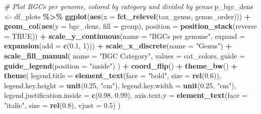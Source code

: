 \documentclass[
]{article}
\newenvironment{Shaded}{\begin{snugshade}}{\end{snugshade}}
\newcommand{\AttributeTok}[1]{\textcolor[rgb]{0.13,0.29,0.53}{#1}}
\newcommand{\CommentTok}[1]{\textcolor[rgb]{0.56,0.35,0.01}{\textit{#1}}}
\newcommand{\ConstantTok}[1]{\textcolor[rgb]{0.56,0.35,0.01}{#1}}
\newcommand{\DecValTok}[1]{\textcolor[rgb]{0.00,0.00,0.81}{#1}}
\newcommand{\FloatTok}[1]{\textcolor[rgb]{0.00,0.00,0.81}{#1}}
\newcommand{\FunctionTok}[1]{\textcolor[rgb]{0.13,0.29,0.53}{\textbf{#1}}}
\newcommand{\NormalTok}[1]{#1}
\newcommand{\OtherTok}[1]{\textcolor[rgb]{0.56,0.35,0.01}{#1}}
\newcommand{\SpecialCharTok}[1]{\textcolor[rgb]{0.81,0.36,0.00}{\textbf{#1}}}
\newcommand{\StringTok}[1]{\textcolor[rgb]{0.31,0.60,0.02}{#1}}
\begin{document}
\begin{Shaded}
\begin{Highlighting}[]
\CommentTok{\# Plot BGCs per genome, colored by category and divided by genus}
\NormalTok{p\_bgc\_dens }\OtherTok{\textless{}{-}}\NormalTok{ df\_plots }\SpecialCharTok{\%\textgreater{}\%}
  \FunctionTok{ggplot}\NormalTok{(}\FunctionTok{aes}\NormalTok{(}\AttributeTok{x =} \FunctionTok{fct\_relevel}\NormalTok{(tax\_genus, genus\_order))) }\SpecialCharTok{+}
  \FunctionTok{geom\_col}\NormalTok{(}\FunctionTok{aes}\NormalTok{(}\AttributeTok{y =}\NormalTok{ bgc\_dens, }\AttributeTok{fill =}\NormalTok{ group), }\AttributeTok{position =} \FunctionTok{position\_stack}\NormalTok{(}\AttributeTok{reverse =} \ConstantTok{TRUE}\NormalTok{)) }\SpecialCharTok{+}
  \FunctionTok{scale\_y\_continuous}\NormalTok{(}\AttributeTok{name =} \StringTok{"BGCs per genome"}\NormalTok{, }\AttributeTok{expand =} \FunctionTok{expansion}\NormalTok{(}\AttributeTok{add =} \FunctionTok{c}\NormalTok{(}\FloatTok{0.1}\NormalTok{, }\DecValTok{1}\NormalTok{))) }\SpecialCharTok{+}
  \FunctionTok{scale\_x\_discrete}\NormalTok{(}\AttributeTok{name =} \StringTok{"Genus"}\NormalTok{) }\SpecialCharTok{+}
  \FunctionTok{scale\_fill\_manual}\NormalTok{(}
    \AttributeTok{name =} \StringTok{"BGC Category"}\NormalTok{,}
    \AttributeTok{values =}\NormalTok{ cat\_colors,}
    \AttributeTok{guide =} \FunctionTok{guide\_legend}\NormalTok{(}\AttributeTok{position =} \StringTok{"inside"}\NormalTok{)}
\NormalTok{  ) }\SpecialCharTok{+}
  \FunctionTok{coord\_flip}\NormalTok{() }\SpecialCharTok{+}
  \FunctionTok{theme\_bw}\NormalTok{() }\SpecialCharTok{+}
  \FunctionTok{theme}\NormalTok{(}
    \AttributeTok{legend.title =} \FunctionTok{element\_text}\NormalTok{(}\AttributeTok{face =} \StringTok{"bold"}\NormalTok{, }\AttributeTok{size =} \FunctionTok{rel}\NormalTok{(}\FloatTok{0.6}\NormalTok{)),}
    \AttributeTok{legend.key.height =} \FunctionTok{unit}\NormalTok{(}\FloatTok{0.25}\NormalTok{, }\StringTok{"cm"}\NormalTok{),}
    \AttributeTok{legend.key.width =} \FunctionTok{unit}\NormalTok{(}\FloatTok{0.25}\NormalTok{, }\StringTok{"cm"}\NormalTok{),}
    \AttributeTok{legend.justification.inside =} \FunctionTok{c}\NormalTok{(}\FloatTok{0.98}\NormalTok{, }\FloatTok{0.99}\NormalTok{),}
    \AttributeTok{axis.text.y =} \FunctionTok{element\_text}\NormalTok{(}\AttributeTok{face =} \StringTok{"italic"}\NormalTok{, }\AttributeTok{size =} \FunctionTok{rel}\NormalTok{(}\FloatTok{0.8}\NormalTok{), }\AttributeTok{vjust =} \FloatTok{0.5}\NormalTok{)}
\NormalTok{  )}


\end{Highlighting}
\end{Shaded}
\end{document}
